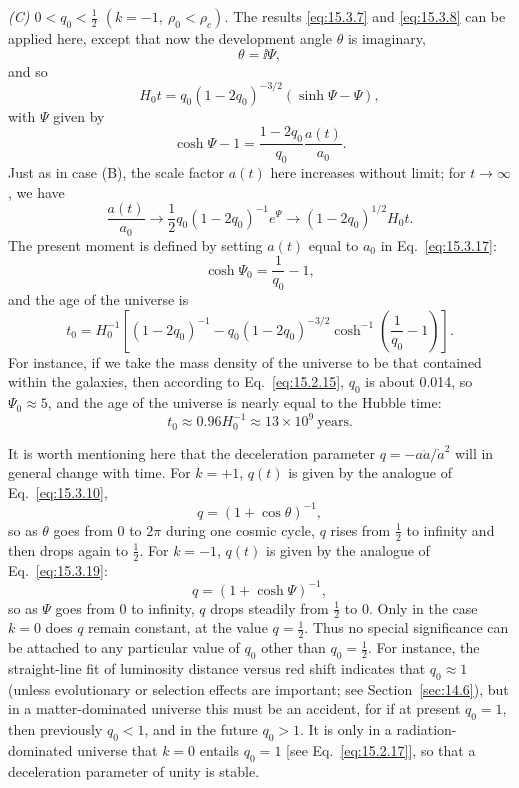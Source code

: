 \emph{(C) \(0<q_0<\tfrac12\)
\((k=-1,\ \rho_0<\rho_c)\).} The results \eqref{eq:15.3.7} and
\eqref{eq:15.3.8} can be applied here, except that now the development angle
\(\theta\) is imaginary,
\[
  \theta=\ii\Psi,
\]
and so
\begin{equation}
  H_0t
  =
  q_0(1-2q_0)^{-3/2}(\sinh\Psi-\Psi),
  \tag{15.3.16}\label{eq:15.3.16}
\end{equation}
with \(\Psi\) given by
\begin{equation}
  \cosh\Psi-1
  =
  \frac{1-2q_0}{q_0}\frac{a(t)}{a_0}.
  \tag{15.3.17}\label{eq:15.3.17}
\end{equation}
Just as in case (B), the scale factor \(a(t)\) here increases without limit;
for \(t\to\infty\), we have
\begin{equation}
  \frac{a(t)}{a_0}
  \longrightarrow
  \frac12q_0(1-2q_0)^{-1}e^\Psi
  \longrightarrow
  (1-2q_0)^{1/2}H_0t.
  \tag{15.3.18}\label{eq:15.3.18}
\end{equation}
The present moment is defined by setting \(a(t)\) equal to \(a_0\) in
Eq.~\eqref{eq:15.3.17}:
\begin{equation}
  \cosh\Psi_0=\frac1{q_0}-1,
  \tag{15.3.19}\label{eq:15.3.19}
\end{equation}
and the age of the universe is
\begin{equation}
  t_0
  =
  H_0^{-1}
  \left[
    (1-2q_0)^{-1}
    -q_0(1-2q_0)^{-3/2}
      \cosh^{-1}\left(\frac1{q_0}-1\right)
  \right].
  \tag{15.3.20}\label{eq:15.3.20}
\end{equation}
For instance, if we take the mass density of the universe to be that contained
within the galaxies, then according to Eq.~\eqref{eq:15.2.15},
\(q_0\) is about 0.014, so \(\Psi_0\approx5\), and the age of the universe
is nearly equal to the Hubble time:
\begin{equation}
  t_0\approx0.96H_0^{-1}\approx13\times10^9\ \text{years}.
  \tag{15.3.21}\label{eq:15.3.21}
\end{equation}

It is worth mentioning here that the deceleration parameter
\(q=-a\ddot a/\dot a^2\) will in general change with time. For \(k=+1\),
\(q(t)\) is given by the analogue of Eq.~\eqref{eq:15.3.10},
\[
  q=(1+\cos\theta)^{-1},
\]
so as \(\theta\) goes from 0 to \(2\pi\) during one cosmic cycle, \(q\)
rises from \(\tfrac12\) to infinity and then drops again to \(\tfrac12\).
For \(k=-1\), \(q(t)\) is given by the analogue of
Eq.~\eqref{eq:15.3.19}:
\[
  q=(1+\cosh\Psi)^{-1},
\]
so as \(\Psi\) goes from 0 to infinity, \(q\) drops steadily from
\(\tfrac12\) to 0. Only in the case \(k=0\) does \(q\) remain constant,
at the value \(q=\tfrac12\). Thus no special significance can be attached
to any particular value of \(q_0\) other than \(q_0=\tfrac12\). For
instance, the straight-line fit of luminosity distance versus red shift
indicates that \(q_0\approx1\) (unless evolutionary or selection effects are
important; see Section~\ref{sec:14.6}), but in a matter-dominated universe
this must be an accident, for if at present \(q_0=1\), then previously
\(q_0<1\), and in the future \(q_0>1\). It is only in a
radiation-dominated universe that \(k=0\) entails \(q_0=1\) [see
Eq.~\eqref{eq:15.2.17}], so that a deceleration parameter of unity is stable.


